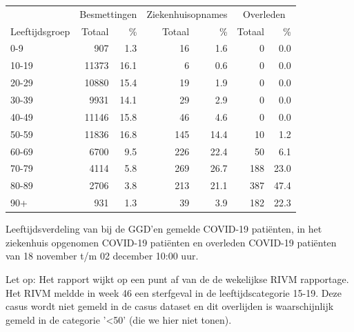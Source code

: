 \documentclass[
  english,
  man,floatsintext]{apa6}
\begin{document}
\begin{table}[H]
\centering\begingroup\fontsize{11}{13}\selectfont

\begin{threeparttable}
\begin{tabular}{lrrrrrr}
\toprule
\multicolumn{1}{c}{ } & \multicolumn{2}{c}{Besmettingen} & \multicolumn{2}{c}{Ziekenhuisopnames} & \multicolumn{2}{c}{Overleden} \\
\cmidrule(l{3pt}r{3pt}){2-3} \cmidrule(l{3pt}r{3pt}){4-5} \cmidrule(l{3pt}r{3pt}){6-7}
Leeftijdsgroep & Totaal & \% & Totaal & \% & Totaal & \%\\
\midrule
0-9 & 907 & 1.3 & 16 & 1.6 & 0 & 0.0\\
10-19 & 11373 & 16.1 & 6 & 0.6 & 0 & 0.0\\
20-29 & 10880 & 15.4 & 19 & 1.9 & 0 & 0.0\\
30-39 & 9931 & 14.1 & 29 & 2.9 & 0 & 0.0\\
40-49 & 11146 & 15.8 & 46 & 4.6 & 0 & 0.0\\
50-59 & 11836 & 16.8 & 145 & 14.4 & 10 & 1.2\\
60-69 & 6700 & 9.5 & 226 & 22.4 & 50 & 6.1\\
70-79 & 4114 & 5.8 & 269 & 26.7 & 188 & 23.0\\
80-89 & 2706 & 3.8 & 213 & 21.1 & 387 & 47.4\\
90+ & 931 & 1.3 & 39 & 3.9 & 182 & 22.3\\
\bottomrule
\end{tabular}
\begin{tablenotes}
\item[1] Leeftijdsverdeling van bij de GGD’en gemelde COVID-19 patiënten, in het ziekenhuis opgenomen COVID-19 patiënten en overleden COVID-19 patiënten van 18 november t/m 02 december 10:00 uur.
\item[2] Let op: Het rapport wijkt op een punt af van de de wekelijkse RIVM rapportage. Het RIVM meldde in week 46 een sterfgeval in de leeftijdscategorie 15-19. Deze casus wordt niet gemeld in de casus dataset en dit overlijden is waarschijnlijk gemeld in de categorie '<50' (die we hier niet tonen).
\end{tablenotes}
\end{threeparttable}
\endgroup{}
\end{table}

\newpage
\end{document}
